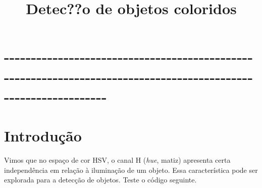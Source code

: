 \documentclass[11pt]{article}
\title{Detec??o de objetos coloridos}
\begin{document}
    
    
    \maketitle
    
    

    
    \section{-\/-\/-\/-\/-\/-\/-\/-\/-\/-\/-\/-\/-\/-\/-\/-\/-\/-\/-\/-\/-\/-\/-\/-\/-\/-\/-\/-\/-\/-\/-\/-\/-\/-\/-\/-\/-\/-\/-\/-\/-\/-\/-\/-\/-\/-\/-\/-\/-\/-\/-\/-\/-\/-\/-\/-\/-\/-\/-\/-\/-\/-\/-\/-\/-\/-\/-\/-\/-\/-\/-\/-\/-\/-\/-\/-\/-\/-\/-\/-\/-\/-\/-\/-\/-\/-\/-\/-\/-\/-\/-\/-\/-\/-\/-\/-\/-\/-\/-\/-\/-\/-\/-\/-\/-\/-\/-\/-\/-\/-\/-}\label{section}

\section{Introdução}\label{introduuxe7uxe3o}

    Vimos que no espaço de cor HSV, o canal H (\emph{hue}, matiz) apresenta
certa independência em relação à iluminação de um objeto. Essa
característica pode ser explorada para a detecção de objetos. Teste o
código seguinte.
\end{document}
